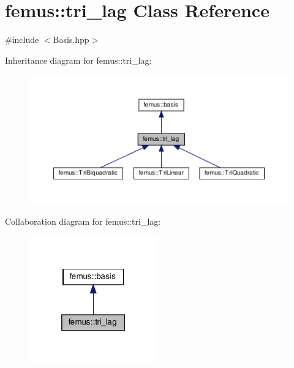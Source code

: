 \hypertarget{classfemus_1_1tri__lag}{}\section{femus\+:\+:tri\+\_\+lag Class Reference}
\label{classfemus_1_1tri__lag}


{\ttfamily \#include $<$Basis.\+hpp$>$}



Inheritance diagram for femus\+:\+:tri\+\_\+lag\+:
\nopagebreak
\begin{figure}[H]
\begin{center}
\leavevmode
\includegraphics[width=350pt]{classfemus_1_1tri__lag__inherit__graph}
\end{center}
\end{figure}


Collaboration diagram for femus\+:\+:tri\+\_\+lag\+:
\nopagebreak
\begin{figure}[H]
\begin{center}
\leavevmode
\includegraphics[width=157pt]{classfemus_1_1tri__lag__coll__graph}
\end{center}
\end{figure}
